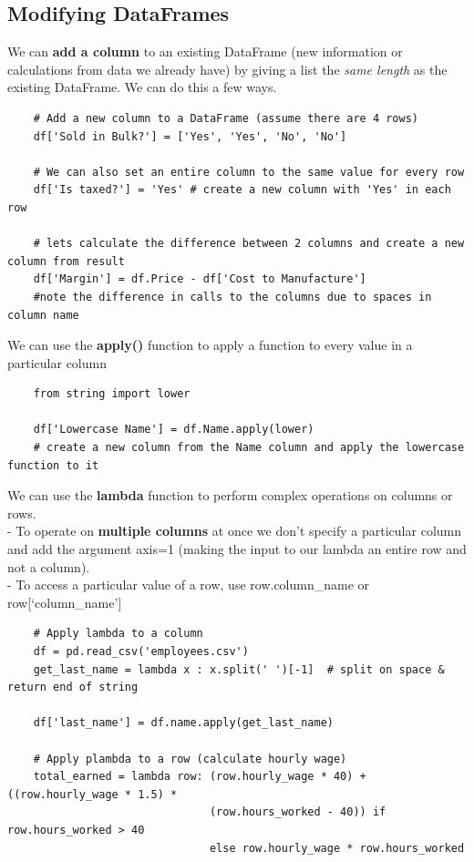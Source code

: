 \documentclass[11pt, a4paper]{article}
\begin{document}
\begin{spacing}{1.1}
	\subsection{Modifying DataFrames}
	We can \textbf{add a column} to an existing DataFrame (new information or calculations from data we already have) by giving a list the \textit{same length} as the existing DataFrame. We can do this a few ways.
	\begin{lstlisting}
	# Add a new column to a DataFrame (assume there are 4 rows)
	df['Sold in Bulk?'] = ['Yes', 'Yes', 'No', 'No']
	
	# We can also set an entire column to the same value for every row
	df['Is taxed?'] = 'Yes' # create a new column with 'Yes' in each row
	
	# lets calculate the difference between 2 columns and create a new column from result
	df['Margin'] = df.Price - df['Cost to Manufacture'] 
	#note the difference in calls to the columns due to spaces in column name \end{lstlisting} \vspace*{1mm}
	We can use the \textbf{apply()} function to apply a function to every value in a particular column
	\begin{lstlisting}
	from string import lower
	
	df['Lowercase Name'] = df.Name.apply(lower)
	# create a new column from the Name column and apply the lowercase function to it \end{lstlisting}\vspace*{1mm}
	We can use the \textbf{lambda} function to perform complex operations on columns or rows. \\
	\hspace*{4mm} - To operate on \textbf{multiple columns} at once we don't specify a particular column and add the argument \hspace*{7mm} axis=1 (making the input to our lambda an entire row and not a column). \\
	\hspace*{4mm} - To access a particular value of a row, use row.column\_name or row[`column\_name']
	\begin{lstlisting}
	# Apply lambda to a column
	df = pd.read_csv('employees.csv')
	get_last_name = lambda x : x.split(' ')[-1]  # split on space & return end of string
	
	df['last_name'] = df.name.apply(get_last_name)
	
	# Apply plambda to a row (calculate hourly wage)
	total_earned = lambda row: (row.hourly_wage * 40) + ((row.hourly_wage * 1.5) *  
	                           (row.hours_worked - 40)) if row.hours_worked > 40 
	                           else row.hourly_wage * row.hours_worked
	

\end{lstlisting}
\end{spacing}
\end{document}
